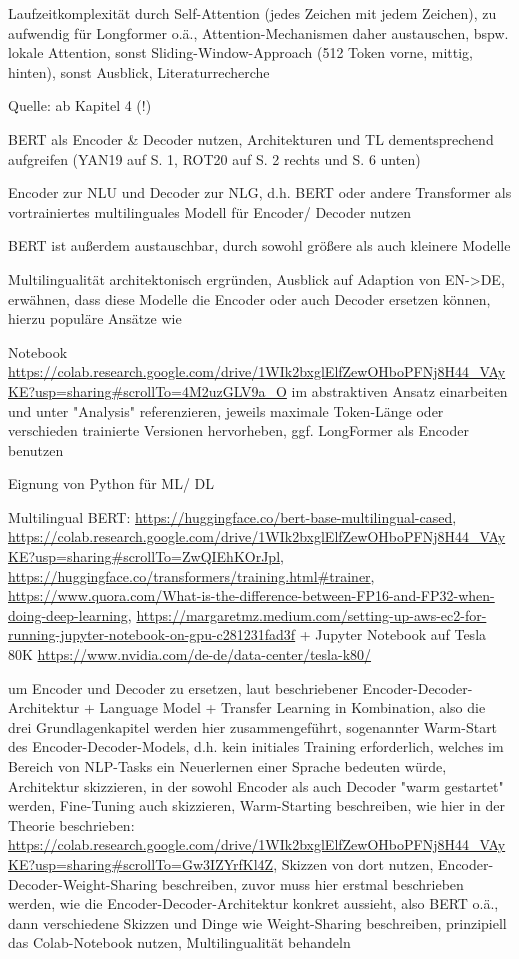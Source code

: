 Laufzeitkomplexität durch Self-Attention (jedes Zeichen mit jedem Zeichen), zu aufwendig für Longformer o.ä., Attention-Mechanismen daher austauschen, bspw. lokale Attention, sonst Sliding-Window-Approach (512 Token vorne, mittig, hinten), sonst Ausblick, Literaturrecherche

Quelle: \cite{NIT19} ab Kapitel 4 (!)

BERT als Encoder \& Decoder nutzen, Architekturen und TL dementsprechend aufgreifen (YAN19 auf S. 1, ROT20 auf S. 2 rechts und S. 6 unten)

Encoder zur NLU und Decoder zur NLG, d.h. BERT oder andere Transformer als vortrainiertes multilinguales Modell für Encoder/ Decoder nutzen

BERT ist außerdem austauschbar, durch sowohl größere als auch kleinere Modelle

Multilingualität architektonisch ergründen, Ausblick auf Adaption von EN->DE, erwähnen, dass diese Modelle die Encoder oder auch Decoder ersetzen können, hierzu populäre Ansätze wie \cite{ROT20}

Notebook \url{https://colab.research.google.com/drive/1WIk2bxglElfZewOHboPFNj8H44_VAyKE?usp=sharing#scrollTo=4M2uzGLV9a_O} im abstraktiven Ansatz einarbeiten und unter "Analysis" referenzieren, jeweils maximale Token-Länge oder verschieden trainierte Versionen hervorheben, ggf. LongFormer als Encoder benutzen

Eignung von Python für ML/ DL

Multilingual BERT: \url{https://huggingface.co/bert-base-multilingual-cased}, \url{https://colab.research.google.com/drive/1WIk2bxglElfZewOHboPFNj8H44_VAyKE?usp=sharing#scrollTo=ZwQIEhKOrJpl}, \url{https://huggingface.co/transformers/training.html#trainer}, \url{https://www.quora.com/What-is-the-difference-between-FP16-and-FP32-when-doing-deep-learning}, \url{https://margaretmz.medium.com/setting-up-aws-ec2-for-running-jupyter-notebook-on-gpu-c281231fad3f} + Jupyter Notebook auf Tesla 80K \url{https://www.nvidia.com/de-de/data-center/tesla-k80/}

\cite{ROT20} um Encoder und Decoder zu ersetzen, laut beschriebener Encoder-Decoder-Architektur + Language Model + Transfer Learning in Kombination, also die drei Grundlagenkapitel werden hier zusammengeführt, sogenannter Warm-Start des Encoder-Decoder-Models, d.h. kein initiales Training erforderlich, welches im Bereich von NLP-Tasks ein Neuerlernen einer Sprache bedeuten würde, Architektur skizzieren, in der sowohl Encoder als auch Decoder "warm gestartet" werden, Fine-Tuning auch skizzieren, Warm-Starting beschreiben, wie hier in der Theorie beschrieben: \url{https://colab.research.google.com/drive/1WIk2bxglElfZewOHboPFNj8H44_VAyKE?usp=sharing#scrollTo=Gw3IZYrfKl4Z}, Skizzen von dort nutzen, Encoder-Decoder-Weight-Sharing beschreiben, zuvor muss hier erstmal beschrieben werden, wie die Encoder-Decoder-Architektur konkret aussieht, also BERT o.ä., dann verschiedene Skizzen und Dinge wie Weight-Sharing beschreiben, prinzipiell das Colab-Notebook nutzen, Multilingualität behandeln

